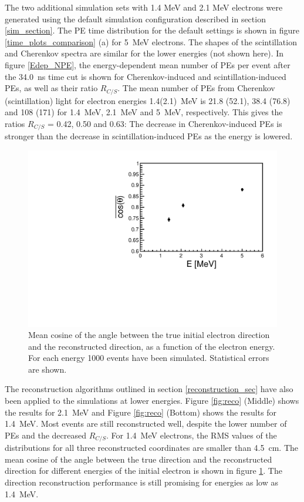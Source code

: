 \documentclass[cits]{JINST}
\begin{document}
The two additional simulation sets with 1.4 MeV and 2.1 MeV electrons were
generated using the default simulation configuration described in section
\ref{sim_section}. The PE time distribution for the default settings is shown
in figure \ref{time_plots_comparison} (a) for 5~MeV electrons. The shapes
of the scintillation and Cherenkov spectra are similar for the lower energies (not
shown here). In figure \ref{Edep_NPE}, the energy-dependent mean number of
PEs per event after the 34.0~ns time cut is shown for Cherenkov-induced and
scintillation-induced PEs, as well as their ratio $R_{C/S}$. The mean number
of PEs from Cherenkov (scintillation) light for electron energies 1.4(2.1)~MeV is 21.8 (52.1), 38.4 (76.8)
and 108 (171) for 1.4~MeV, 2.1~MeV and 5~MeV, respectively. This gives the
ratios $R_{C/S}$ = 0.42, 0.50 and 0.63: The decrease in Cherenkov-induced
PEs is stronger than the decrease in scintillation-induced PEs as the energy
is lowered.

\begin{figure}
        \begin{center}
        \includegraphics[scale=0.4]{graphs/hCos_vs_E_final.pdf}
        \caption[]{Mean cosine of the angle between the true initial electron direction and the reconstructed direction, as a function of the electron energy. For each energy 1000 events have been simulated. Statistical errors are
shown. \label{Edep_angle}}
        \end{center}
\end{figure}

The reconstruction algorithms outlined in section \ref{reconstruction_sec} have also been applied
to the simulations at lower energies. Figure \ref{fig:reco} (Middle) shows the results for 2.1~MeV and Figure \ref{fig:reco} (Bottom) shows the results for 1.4~MeV. Most events are still reconstructed well, despite the lower
number of PEs and the decreased $R_{C/S}$. For 1.4~MeV electrons, the RMS values of the distributions for all three
reconstructed coordinates are smaller than 4.5~cm. The mean cosine of the angle between the true direction
and the reconstructed direction for different energies of the initial electron is shown in figure
\ref{Edep_angle}. The direction reconstruction performance is still promising for energies as low as 1.4~MeV.
\end{document}
